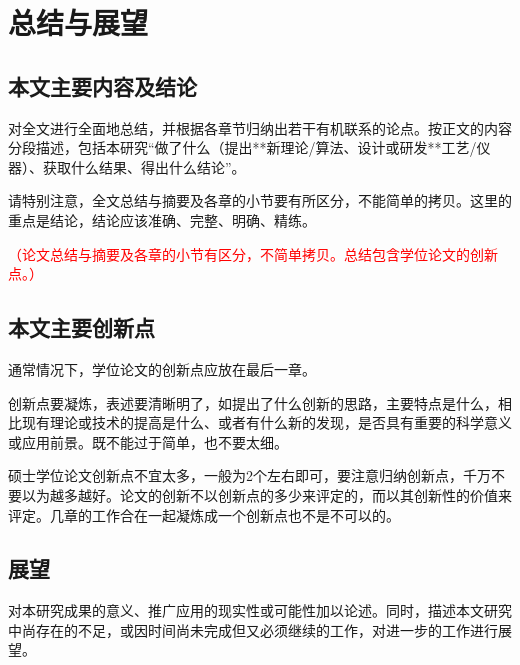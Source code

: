
\chapter{总结与展望}
\label{cha:conclusion}

\section{本文主要内容及结论}
\label{sec:conclusion}
对全文进行全面地总结，并根据各章节归纳出若干有机联系的论点。按正文的内容分段描述，包括本研究“做了什么（提出**新理论/算法、设计或研发**工艺/仪器）、获取什么结果、得出什么结论”。

请特别注意，全文总结与摘要及各章的小节要有所区分，不能简单的拷贝。这里的重点是结论，结论应该准确、完整、明确、精练。

\textcolor{red}{（论文总结与摘要及各章的小节有区分，不简单拷贝。总结包含学位论文的创新点。）}


\section{本文主要创新点}
\label{sec:contribution}
通常情况下，学位论文的创新点应放在最后一章。

创新点要凝炼，表述要清晰明了，如提出了什么创新的思路，主要特点是什么，相比现有理论或技术的提高是什么、或者有什么新的发现，是否具有重要的科学意义或应用前景。既不能过于简单，也不要太细。

硕士学位论文创新点不宜太多，一般为2个左右即可，要注意归纳创新点，千万不要以为越多越好。论文的创新不以创新点的多少来评定的，而以其创新性的价值来评定。几章的工作合在一起凝炼成一个创新点也不是不可以的。


\section{展望}
\label{sec:futurework}
对本研究成果的意义、推广应用的现实性或可能性加以论述。同时，描述本文研究中尚存在的不足，或因时间尚未完成但又必须继续的工作，对进一步的工作进行展望。